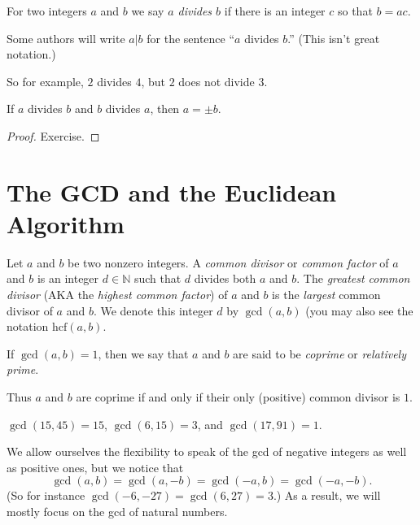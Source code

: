 \documentclass[11pt,dvipsnames]{book}
\def\N{{\mathbb{N}}}
\numberwithin{figure}{section} %
\numberwithin{table}{section} %
\begin{document}
\begin{definition}
For two integers $a$ and $b$ we say {\it $a$ divides $b$} if there is an integer $c$ so that $b=ac$.

Some authors will write $a | b$ for the sentence ``$a$ divides $b$.''
(This isn't great notation.)
\end{definition}

\noindent So for example, $2$ divides $4$, but $2$ does not divide $3$.

\begin{lemma}
\label{l:abba}
If $a$ divides $b$ and $b$ divides $a$, then $a=\pm b$.
\end{lemma}

\begin{proof}
Exercise.
\end{proof}


\section{The GCD and the Euclidean Algorithm}

\begin{definition}
Let $a$ and $b$ be two nonzero integers.
A \emph{common divisor} or \emph{common factor} of $a$ and $b$ is an integer $d \in \N$ such that $d$ divides both $a$ and $b$.
The {\it greatest common divisor} (AKA the {\it highest common factor}) of $a$ and $b$ is the \emph{largest} common divisor of $a$ and $b$.
We denote this integer $d$ by $\gcd(a,b)$ (you may also see the notation $\mathrm{hcf}(a,b)$.

If $\gcd(a,b)=1$, then we say that $a$ and $b$ are said to be {\it coprime} or {\it relatively prime}.
\end{definition}

Thus $a$ and $b$ are coprime if and only if their only (positive) common divisor is $1$.

\begin{example} $\gcd(15,45)=15$,
$\gcd(6,15)=3$, and $\gcd(17,91)=1$.
\end{example}

\begin{example}
We allow ourselves the flexibility to speak of the gcd of negative integers as well as positive ones, but we notice that
\[
\gcd(a,b) = \gcd(a,-b) = \gcd(-a,b) = \gcd(-a,-b).
\]
(So for instance $\gcd(-6,-27) = \gcd(6, 27) = 3$.)
As a result, we will mostly focus on the gcd of natural numbers.
\end{example}
\end{document}
